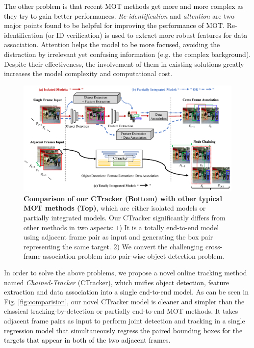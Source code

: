 \documentclass[../arXiv_main.tex]{subfiles}
\newcommand\wca[1]{\textcolor{black}{#1}}
\newcommand{\yang}[1]{\textcolor{black}{#1}}
\newcommand\CRwfb[1]{\textcolor{black}{#1}}
\newcommand{\CRyang}[1]{\textcolor{black}{#1}}
\begin{document}
\CRyang{The other problem is that recent MOT methods get more and more complex as they try to gain better performances.}
\emph{Re-identification} and \emph{attention} are two major points found to be helpful for improving \CRwfb{the performance of MOT}. Re-identification (or ID verification) is used to extract more robust \CRwfb{features} for data association. Attention helps the model \CRyang{to be more focused, avoiding} the distraction by irrelevant yet confusing information (e.g. the complex background). Despite their effectiveness, the involvement of them in existing solutions greatly increases the model complexity and computational cost.
 

\begin{figure}[t]
\centering
\includegraphics[width=1\columnwidth]{figure/fig1.png}
\caption{\label{fig:comparision}\textbf{Comparison of our CTracker (Bottom) with other typical MOT methods (Top)}, which are either isolated \CRwfb{models} or partially integrated \CRwfb{models}.
Our CTracker significantly differs from other methods in two aspects: $1$) It is a totally end-to-end model using adjacent frame pair as input and generating the box pair representing the same target. $2$) 
We convert the challenging \CRwfb{cross-frame} association problem into pair-wise object detection problem.}
\label{fig:difference}
\end{figure}



In order to solve the above problems, we propose \yang{a novel} online tracking method named \textit{Chained-Tracker} (CTracker), \wca{which unifies object detection, feature extraction and data association into a single \CRyang{end-to-end} model}. As can be seen in Fig. \ref{fig:comparision}, our novel CTracker model is \CRyang{cleaner and simpler than} the classical tracking-by-detection or partially end-to-end MOT methods. It takes adjacent frame \yang{pairs} as input to perform joint detection and tracking in a single \CRyang{regression model that simultaneously regress the paired bounding boxes for the targets that appear in both of the two adjacent frames}. 
\end{document}
